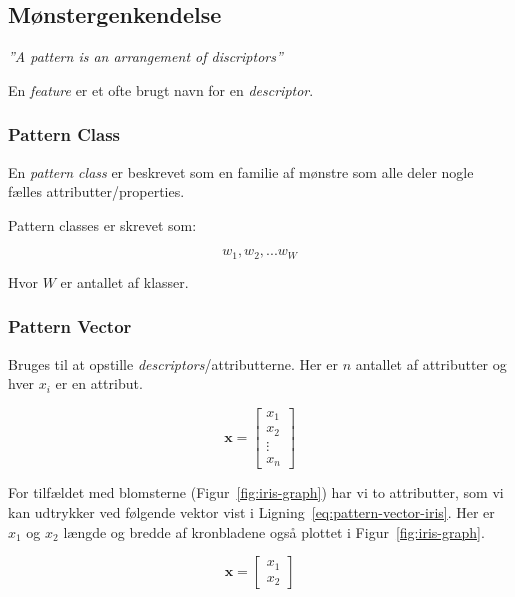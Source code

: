 \subsection{Mønstergenkendelse}

\begin{center}
	\textit{''A pattern is an arrangement of discriptors''}
\end{center}

En \textit{feature} er et ofte brugt navn for en \textit{descriptor}.\\

\subsubsection{Pattern Class}

En \textit{pattern class} er beskrevet som en familie af mønstre som alle deler nogle fælles attributter/properties.

Pattern classes er skrevet som: 

\begin{equation}
w_1, w_2,...w_W
\end{equation}

Hvor $W$ er antallet af klasser.

\subsubsection{Pattern Vector}

Bruges til at opstille \textit{descriptors}/attributterne. Her er $n$ antallet af attributter og hver $x_i$ er en attribut.

\begin{equation}
\mathbf{x} = \begin{bmatrix}x_1\\ x_2\\ \vdots \\ x_n\end{bmatrix}
\end{equation}

For tilfældet med blomsterne (Figur~\ref{fig:iris-graph}) har vi to attributter, som vi kan udtrykker ved følgende vektor vist i Ligning~\ref{eq:pattern-vector-iris}. Her er $x_1$ og $x_2$ længde og bredde af kronbladene også plottet i Figur~\ref{fig:iris-graph}.

\begin{equation}\label{eq:pattern-vector-iris}
\mathbf{x} = \begin{bmatrix}x_1\\ x_2\end{bmatrix}
\end{equation}


